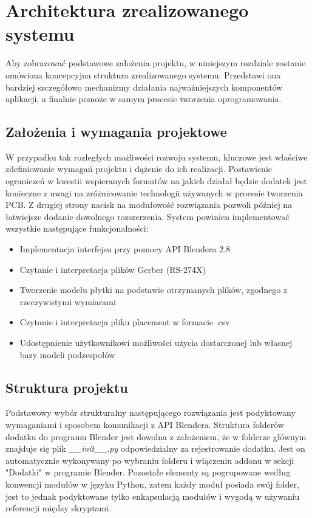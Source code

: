 \documentclass[brudnopis]{xmgr}
\begin{document}
\chapter{Architektura zrealizowanego systemu}
Aby zobrazować podstawowe założenia projektu, w niniejszym rozdziale zostanie omówiona koncepcyjna struktura zrealizowanego systemu. Przedstawi ona bardziej szczegółowo mechanizmy działania najważniejszych komponentów aplikacji, a finalnie pomoże w samym procesie tworzenia oprogramowania.

\section{Założenia i wymagania projektowe}
W przypadku tak rozległych możliwości rozwoju systemu, kluczowe jest właściwe zdefiniowanie wymagań projektu i dążenie do ich realizacji. Postawienie ograniczeń w kwestii wspieranych formatów na jakich działał będzie dodatek jest konieczne z uwagi na zróżnicowanie technologii używanych w procesie tworzenia PCB. Z drugiej strony nacisk na modułowość rozwiązania pozwoli później na łatwiejsze dodanie dowolnego rozszerzenia.
System powinien implementować wszystkie następujące funkcjonalności:

\begin{itemize}

\item Implementacja interfejsu przy pomocy API Blendera 2.8

\item Czytanie i interpretacja plików Gerber (RS-274X)

\item Tworzenie modelu płytki na podstawie otrzymanych plików, zgodnego z rzeczywistymi wymiarami

\item Czytanie i interpretacja pliku placement w formacie .csv

\item Udostępnienie użytkownikowi możliwości użycia dostarczonej lub własnej bazy modeli podzespołów

\end{itemize}

\section {Struktura projektu}
Podstawowy wybór strukturalny następującego rozwiązania jest podyktowany wymaganiami i sposobem komunikacji z API Blendera. Struktura folderów dodatku do programu Blender jest dowolna z założeniem, że w folderze głównym znajduje się plik \emph{\_\_init\_\_.py} odpowiedzialny za rejestrowanie dodatku. Jest on automatycznie wykonywany po wybraniu folderu i włączeniu addonu w sekcji "Dodatki" w programie Blender. Pozostałe elementy są pogrupowane według konwencji modułów w języku Python, zatem każdy moduł posiada swój folder, jest to jednak podyktowane tylko enkapsulacją modułów i wygodą w używaniu referencji między skryptami.
\end{document}
